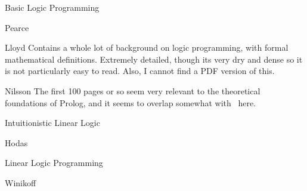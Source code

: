 \begin{pgroup}{Basic Logic Programming}
  \begin{paper}{Pearce}
    \mustread
  \end{paper}

  \begin{paper}{Lloyd}
    Contains a whole lot of background on logic programming, with formal mathematical definitions.
    Extremely detailed, though its very dry and dense so it is not particularly easy to read.
    Also, I cannot find a PDF version of this.

    \mustread
  \end{paper}

  \begin{paper}{Nilsson}
    The first 100 pages or so seem very relevant to the theoretical foundations of Prolog, and it seems to overlap somewhat with~\cite{Lloyd} here.

    \mustread
  \end{paper}
\end{pgroup}

\begin{pgroup}{Intuitionistic Linear Logic}
  \begin{paper}{Hodas}
    \mustread
  \end{paper}
\end{pgroup}

\begin{pgroup}{Linear Logic Programming}
  \begin{paper}{Winikoff}
    \mustread
  \end{paper}
\end{pgroup}
